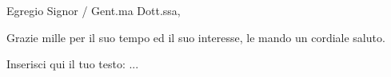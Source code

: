 \documentclass[11pt,a4paper,roman]{moderncv}
\begin{document}
\date{\today}
\opening{Egregio Signor / Gent.ma Dott.ssa,} %
\closing{Grazie mille per il suo tempo ed il suo interesse, le mando un cordiale saluto.} %

\makelettertitle  %

Inserisci qui il tuo testo: ...


\vspace{0.5cm}
\makeletterclosing
\end{document}
